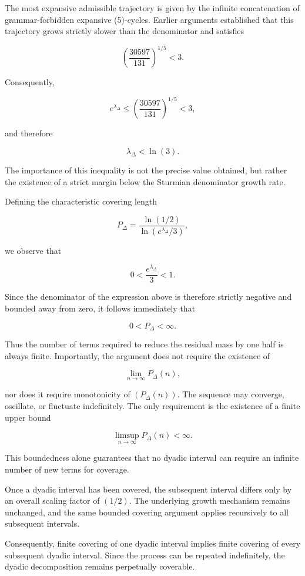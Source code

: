 \documentclass[12pt, oneside]{article}
\numberwithin{equation}{section}
\theoremstyle{definition}
\theoremstyle{plain}
\theoremstyle{remark}
\begin{document}
The most expansive admissible trajectory is given by the infinite concatenation
of grammar-forbidden expansive (5)-cycles. Earlier arguments established that
this trajectory grows strictly slower than the denominator and satisfies

\[
\left(\frac{30597}{131}\right)^{1/5} < 3.
\]

Consequently,

\[
e^{\lambda_{\Delta}} \le \left(\frac{30597}{131}\right)^{1/5} < 3,
\]

and therefore

\[
\lambda_{\Delta} < \ln(3).
\]

The importance of this inequality is not the precise value obtained, but rather
the existence of a strict margin below the Sturmian denominator growth rate.

Defining the characteristic covering length

\[
P_{\Delta} = \frac{\ln(1/2)}{\ln\left(e^{\lambda_{\Delta}}/3\right)},
\]

we observe that

\[
0 < \frac{e^{\lambda_{\Delta}}}{3} < 1.
\]

Since the denominator of the expression above is therefore strictly negative
and bounded away from zero, it follows immediately that

\[
0 < P_{\Delta} < \infty.
\]

Thus the number of terms required to reduce the residual mass by one half is
always finite.  Importantly, the argument does not require the existence of

\[
\lim_{n\to\infty} P_{\Delta}(n),
\]

nor does it require monotonicity of $(P_{\Delta}(n))$. The sequence may converge,
oscillate, or fluctuate indefinitely. The only requirement is the existence of a
finite upper bound

\[
\limsup_{n\to\infty} P_{\Delta}(n) < \infty.
\]

This boundedness alone guarantees that no dyadic interval can require an infinite
number of new terms for coverage.

Once a dyadic interval has been covered, the subsequent interval differs only by
an overall scaling factor of $(1/2)$. The underlying growth mechanism remains
unchanged, and the same bounded covering argument applies recursively to all
subsequent intervals.

Consequently, finite covering of one dyadic interval implies finite covering of
every subsequent dyadic interval. Since the process can be repeated indefinitely,
the dyadic decomposition remains perpetually coverable.
\end{document}
